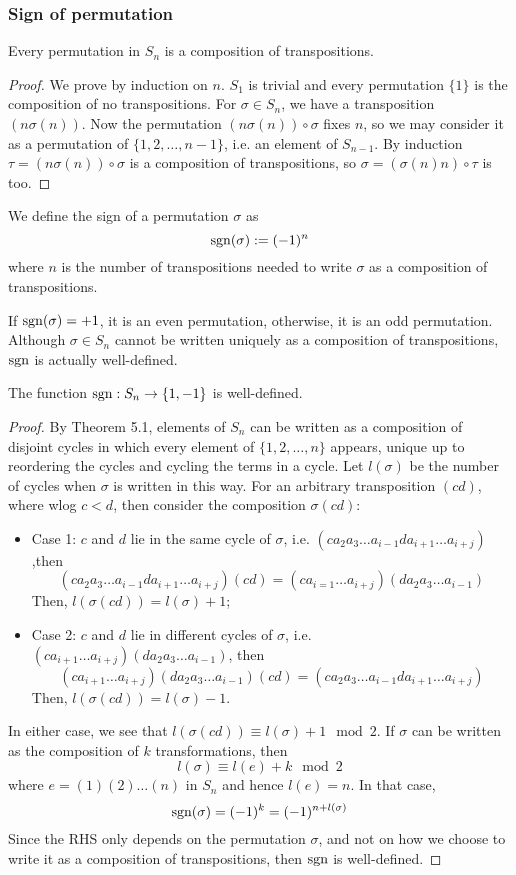 \documentclass[a4paper]{article}
\begin{document}
\subsubsection{Sign of permutation}
\begin{prop}
Every permutation in $S_n$ is a composition of transpositions.
\end{prop}
\begin{proof}
We prove by induction on $n$. $S_1$ is trivial and every permutation $\{1\}$ is the composition of no transpositions. For $\sigma\in S_n$, we have a transposition $(n\sigma(n))$. Now the permutation $(n\sigma(n))\circ\sigma$ fixes $n$, so we may consider it as a permutation of $\{1,2,\dots,n-1\}$, i.e. an element of $S_{n-1}$. By induction $\tau=(n\sigma(n))\circ\sigma$ is a composition of transpositions, so $\sigma=(\sigma(n)n)\circ\tau$ is too.
\end{proof}
\begin{defi}[Sign]
We define the sign of a permutation $\sigma$ as
$$\operatorname{sgn}(\sigma):=(-1)^n$$
where $n$ is the number of transpositions needed to write $\sigma$ as a composition of transpositions.
\end{defi}
If $\operatorname{sgn}(\sigma)=+1$, it is an even permutation, otherwise, it is an odd permutation. Although $\sigma\in S_n$ cannot be written uniquely as a composition of transpositions, $\operatorname{sgn}$ is actually well-defined.
\begin{thm}
The function $\operatorname{sgn}:S_n\rightarrow\{1,-1\}$ is well-defined.
\end{thm}
\begin{proof}
By Theorem 5.1, elements of $S_n$ can be written as a composition of disjoint cycles in which every element of $\{1,2,\dots,n\}$ appears, unique up to reordering the cycles and cycling the terms in a cycle. Let $l(\sigma)$ be the number of cycles when $\sigma$ is written in this way. For an arbitrary transposition $(cd)$, where wlog $c<d$, then consider the composition $\sigma(cd)$:
\begin{itemize}
    \item Case 1: $c$ and $d$ lie in the same cycle of $\sigma$, i.e. $(ca_2a_3\dots a_{i-1}da_{i+1}\dots a_{i+j})$,then
    $$(ca_2a_3\dots a_{i-1}da_{i+1}\dots a_{i+j})(cd)=(ca_{i=1}\dots a_{i+j})(da_2a_3\dots a_{i-1})$$
    Then, $l(\sigma(cd))=l(\sigma)+1$;
    \item Case 2: $c$ and $d$ lie in different cycles of $\sigma$, i.e. $(ca_{i+1}\dots a_{i+j})(da_2a_3\dots a_{i-1})$, then
    $$(ca_{i+1}\dots a_{i+j})(da_2a_3\dots a_{i-1})(cd)=(ca_2a_3\dots a_{i-1}da_{i+1}\dots a_{i+j})$$
    Then, $l(\sigma(cd))=l(\sigma)-1$.
\end{itemize}
In either case, we see that $l(\sigma(cd))\equiv l(\sigma)+1\mod 2$. If $\sigma$ can be written as the composition of $k$ transformations, then
$$l(\sigma)\equiv l(e)+k\mod 2$$
where $e=(1)(2)\dots(n)$ in $S_n$ and hence $l(e)=n$. In that case,
$$\operatorname{sgn}(\sigma)=(-1)^k=(-1)^{n+l(\sigma)}$$
Since the RHS only depends on the permutation $\sigma$, and not on how we choose to write it as a composition of transpositions, then $\operatorname{sgn}$ is well-defined.
\end{proof}
\end{document}
